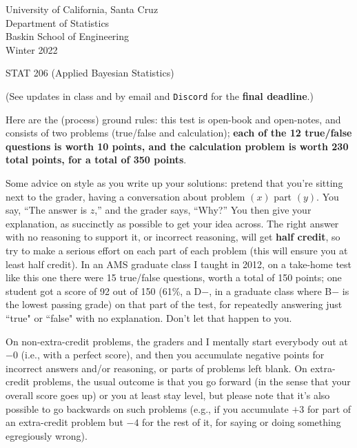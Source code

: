 \documentclass[12pt]{article}
\begin{document}
\begin{flushleft}

University of California, Santa Cruz \\
Department of Statistics \\
Baskin School of Engineering \\
Winter 2022

\end{flushleft}

\Large

\begin{center}

STAT 206 (\textsf{Applied Bayesian Statistics})


\large

(See updates in class and by email and \texttt{Discord} for the \textbf{final deadline}.)

\end{center}

\normalsize

\vspace*{-0.1in}

Here are the (process) ground rules: this test is open-book and open-notes, and
consists of two problems (true/false and calculation); \textbf{each of the 12
true/false questions is worth 10 points, and the calculation problem is
worth 230 total points, for a total of 350 points}.

Some advice on style as you write up your solutions: pretend that you're sitting next to the grader, having a conversation about problem $( x )$ part $( y )$. You say, ``The answer is $z$,'' and the grader says, ``Why?'' You then give your explanation, as succinctly as possible to get your idea across. The right answer with no reasoning to support it, or incorrect reasoning, will get \textbf{half credit}, so try to make a serious effort on each part
of each problem (this will ensure you at least half credit). In an AMS graduate class I taught in 2012, on a take-home test like this one there were 15 true/false questions, worth a total of 150 points; one student got a score of 92 out of 150 (61\%, a D$-$, in a graduate class where B$-$ is the lowest passing grade) on that part of the test, for repeatedly answering just ``true" or ``false" with no explanation. Don't let that happen to you.  

On non-extra-credit problems, the graders and I mentally start everybody out at $-0$ (i.e., with a perfect score), and then you accumulate negative points for
incorrect answers and/or reasoning, or parts of problems left blank. On
extra-credit problems, the usual outcome is that you go forward (in the
sense that your overall score goes up) or you at least stay level, but
please note that it's also possible to go backwards on such problems (e.g.,
if you accumulate $+3$ for part of an extra-credit problem but $-4$ for the
rest of it, for saying or doing something egregiously wrong).
\end{document}
